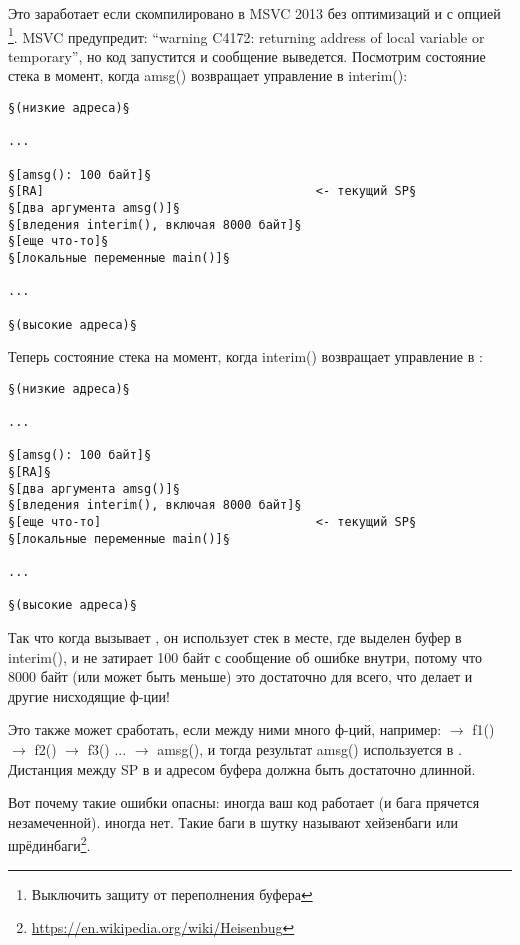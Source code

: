 Это заработает если скомпилировано в MSVC 2013 без оптимизаций и с опцией \footnote{Выключить защиту от переполнения буфера}.
MSVC предупредит: ``warning C4172: returning address of local variable or temporary'', но код запустится и сообщение выведется.
Посмотрим состояние стека в момент, когда amsg() возвращает управление в interim():

\begin{lstlisting}
§(низкие адреса)§

...

§[amsg(): 100 байт]§
§[RA]                                      <- текущий SP§
§[два аргумента amsg()]§
§[вледения interim(), включая 8000 байт]§
§[еще что-то]§
§[локальные переменные main()]§

...

§(высокие адреса)§
\end{lstlisting}

Теперь состояние стека на момент, когда interim() возвращает управление в \main{}:

\begin{lstlisting}
§(низкие адреса)§

...

§[amsg(): 100 байт]§
§[RA]§
§[два аргумента amsg()]§
§[вледения interim(), включая 8000 байт]§
§[еще что-то]                              <- текущий SP§
§[локальные переменные main()]§

...

§(высокие адреса)§
\end{lstlisting}

Так что когда \main вызывает \printf, он использует стек в месте, где выделен буфер в interim(),
и не затирает 100 байт с сообщение об ошибке внутри, потому что 8000 байт (или может быть меньше) это достаточно для всего,
что делает \printf и другие нисходящие ф-ции!

Это также может сработать, если между ними много ф-ций, например:
\main $\rightarrow$ f1() $\rightarrow$ f2() $\rightarrow$ f3() ... $\rightarrow$ amsg(),
и тогда результат amsg() используется в \main.
Дистанция между \ac{SP} в \main и адресом буфера  должна быть достаточно длинной.

Вот почему такие ошибки опасны: иногда ваш код работает (и бага прячется незамеченной). иногда нет.
\label{heisenbug}
Такие баги в шутку называют хейзенбаги или шрёдинбаги\footnote{\url{https://en.wikipedia.org/wiki/Heisenbug}}.

